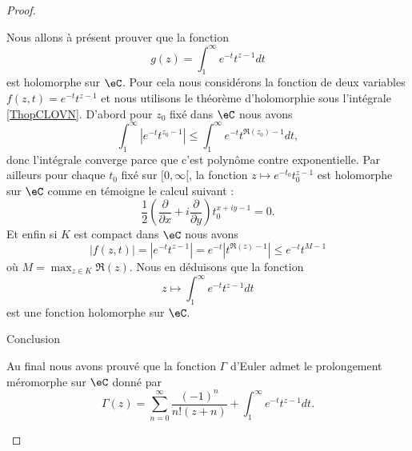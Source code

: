 \begin{proof}
\begin{subproof}
            Nous allons à présent prouver que la fonction
            \begin{equation}
                g(z)=\int_1^{\infty} e^{-t}t^{z-1}dt
            \end{equation}
            est holomorphe sur \( \eC\). Pour cela nous considérons la fonction de deux variables \( f(z,t)= e^{-t}t^{z-1}\) et nous utilisons le théorème d'holomorphie sous l'intégrale \ref{ThopCLOVN}. D'abord pour \( z_0\) fixé dans \( \eC\) nous avons 
            \begin{equation}
                \int_1^{\infty}|  e^{-t}t^{z_0-1} |\leq \int_1^{\infty} e^{-t}t^{\Re(z_0)-1}dt,
            \end{equation}
            donc l'intégrale converge parce que c'est polynôme contre exponentielle. Par ailleurs pour chaque \( t_0\) fixé sur \( \mathopen[ 0 , \infty [\), la fonction \( z\mapsto  e^{-t_0}t_0^{z-1}\) est holomorphe sur \( \eC\) comme en témoigne le calcul suivant :
                \begin{equation}
                    \frac{ 1 }{2}\left( \frac{ \partial  }{ \partial x }+i\frac{ \partial  }{ \partial y } \right)t_0^{x+iy-1}=0.
                \end{equation}
                Et enfin si \( K\) est compact dans \( \eC\) nous avons
                \begin{equation}
                    | f(z,t) |=|  e^{-t}t^{z-1} |= e^{-t}| t^{\Re(z)-1} |\leq  e^{-t}t^{M-1}
                \end{equation}
                où \( M=\max_{z\in K}\Re(z)\). Nous en déduisons que la fonction
                \begin{equation}
                    z\mapsto\int_1^{\infty} e^{-t}t^{z-1}dt
                \end{equation}
                est une fonction holomorphe sur \( \eC\).

            \item[Conclusion]

                Au final nous avons prouvé que la fonction \( \Gamma\) d'Euler admet le prolongement méromorphe sur \( \eC\) donné par
                \begin{equation}
                    \Gamma(z)=\sum_{n=0}^{\infty}\frac{ (-1)^n }{ n!(z+n) }+\int_1^{\infty} e^{-t}t^{z-1}dt.
                \end{equation}
    \end{subproof}
\end{proof}

